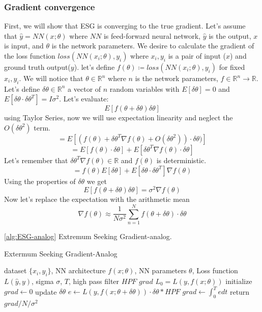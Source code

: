 \documentclass[nohyperref]{article}
\theoremstyle{plain}
\theoremstyle{definition}
\theoremstyle{remark}
\begin{document}
\subsubsection{Gradient convergence}
First, we will show that ESG is converging to the true gradient.
Let's assume that $\hat{y} = NN(x;\theta)$ where $NN$ is feed-forward neural network, $\hat{y}$ is the output, $x$ is input, and $\theta$ is the network parameters.
We desire to calculate the gradient of the loss function $loss(NN(x_{i};\theta),y_{i})$ where ${x_{i},y_{i}}$ is a pair of input ($x$) and ground truth output($y$).
let's define $f(\theta) \coloneqq loss(NN(x_{i};\theta),y_{i})$ for fixed ${x_{i},y_{i}}$.
We will notice that $\theta \in \mathbb{R}^{n} $ where $n$ is the network parameters, $f \in \mathbb{R}^{n}\rightarrow\mathbb{R}$.
Let's define $\delta\theta \in \mathbb{R}^{n}$ a vector of $n$ random variables with $E[\delta\theta]=0$ and $E[\delta\theta \cdot \delta\theta^{T}]=I\sigma^{2}$.
Let's evaluate:
$$E[f(\theta+\delta\theta)\delta\theta]$$
using Taylor Series, now we will use expectation linearity and neglect the $O(\delta\theta^{2})$ term.
$$=E[(f(\theta)+\delta\theta^{T} \nabla f(\theta)+O(\delta\theta^{2}))\cdot \delta\theta)]$$
$$=E[f(\theta)\cdot \delta\theta]+E[\delta\theta^{T} \nabla f(\theta)\cdot \delta\theta]$$
Let's remember that $\delta\theta^{T} \nabla f(\theta) \in \mathbb{R}$ and $f(\theta)$ is deterministic.
$$=f(\theta)E[\delta\theta]+E[\delta\theta \cdot \delta\theta^{T}] \nabla f(\theta)$$
Using the properties of $\delta\theta$ we get
$$E[f(\theta+\delta\theta)\delta\theta]= \sigma^{2}\nabla f(\theta)$$
Now let's replace the expectation with the arithmetic mean
$$\nabla f(\theta) \approx \frac{1}{N\sigma^{2}}\sum^{N}_{n=1} f(\theta+\delta\theta)\cdot \delta\theta$$

\cref{alg:ESG-analog} Extremum Seeking Gradient-analog.

\begin{algorithm}[tb]
   \caption{Extermum Seeking Gradient-Analog}
   \label{alg:ESG-analog}
\begin{algorithmic}
   dataset $\{x_{i},y_{i}\}$, NN architecture $f(x;\theta)$, NN parameters $\theta$, Loss function $L(\hat{y},y)$, sigma $\sigma$, $T$, high pass filter $HPF$
   $grad$ 
   \STATE $L_{0} = L(y,f(x;\theta))$
   \STATE initialize $grad \leftarrow 0$
   \STATE update $\delta\theta$
   \STATE $e \leftarrow L(y,f(x;\theta+\delta \theta))\cdot\delta \theta*HPF$
   \STATE $grad \leftarrow \int_{0}^{T}e dt $ 
   \ENDFOR
   \STATE return $grad/N/\sigma^{2}$
\end{algorithmic}
\end{algorithm}
\end{document}
